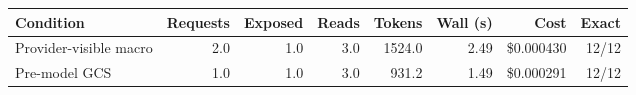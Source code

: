 \begin{tabular}{lrrrrrrr}
\toprule
Condition & Requests & Exposed & Reads & Tokens & Wall (s) & Cost & Exact \\
\midrule
Provider-visible macro & 2.0 & 1.0 & 3.0 & 1524.0 & 2.49 & \$0.000430 & 12/12 \\
Pre-model GCS & 1.0 & 1.0 & 3.0 & 931.2 & 1.49 & \$0.000291 & 12/12 \\
\bottomrule
\end{tabular}
